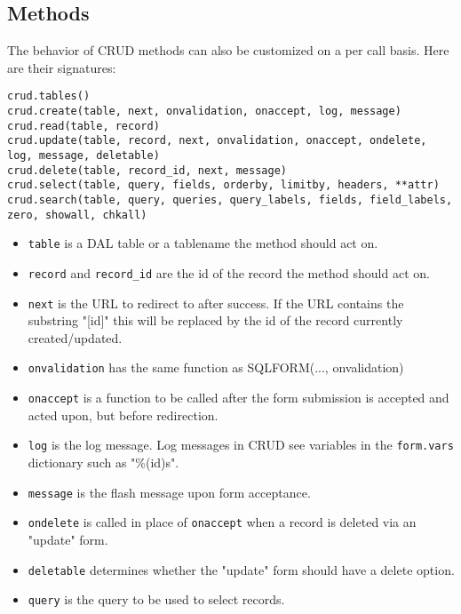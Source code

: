 \documentclass[justified,sixbynine,notoc]{tufte-book}
\def\ft{\small\tt}
\begin{document}
\begin{fullwidth}
\goodbreak\subsection{Methods}

The behavior of CRUD methods can also be customized on a per call basis. Here are their signatures:
\begin{lstlisting}
crud.tables()
crud.create(table, next, onvalidation, onaccept, log, message)
crud.read(table, record)
crud.update(table, record, next, onvalidation, onaccept, ondelete, log, message, deletable)
crud.delete(table, record_id, next, message)
crud.select(table, query, fields, orderby, limitby, headers, **attr)
crud.search(table, query, queries, query_labels, fields, field_labels, zero, showall, chkall)
\end{lstlisting}
\begin{itemize}
\item {\ft table} is a DAL table or a tablename the method should act on.

\item {\ft record} and {\ft record\_id} are the id of the record the method should act on.

\item {\ft next} is the URL to redirect to after success. If the URL contains the substring "[id]" this will be replaced by the id of the record currently created/updated.

\item {\ft onvalidation} has the same function as SQLFORM(..., onvalidation)

\item {\ft onaccept} is a function to be called after the form submission is accepted and acted upon, but before redirection.

\item {\ft log} is the log message. Log messages in CRUD see variables in the {\ft form.vars} dictionary such as "\%(id)s".

\item {\ft message} is the flash message upon form acceptance.

\item {\ft ondelete} is called in place of {\ft onaccept} when a record is deleted via an "update" form.

\item {\ft deletable} determines whether the "update" form should have a delete option.

\item {\ft query} is the query to be used to select records.


\end{itemize}
\end{fullwidth}
\end{document}
